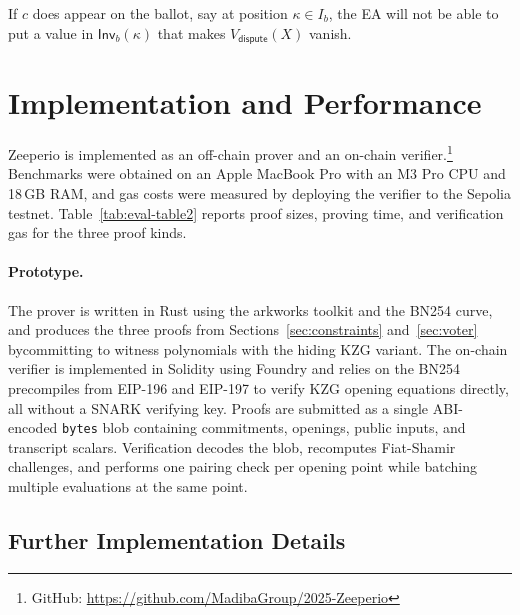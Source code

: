  If $c$ does appear on the ballot, say at position $\kappa\in I_b$, the EA will not be able to put a value in $\mathsf{Inv}_b(\kappa)$ that makes $V_{\mathsf{dispute}}(X)$ vanish. 






\section{Implementation and Performance}
Zeeperio is implemented as an off-chain prover and an on-chain verifier.\footnote{GitHub: \url{https://github.com/MadibaGroup/2025-Zeeperio}}
Benchmarks were obtained on an Apple MacBook Pro with an M3 Pro CPU and 18\,GB RAM, and gas costs were
measured by deploying the verifier to the Sepolia testnet.
Table~\ref{tab:eval-table2} reports proof sizes, proving time, and verification gas for the three proof kinds.\footnotemark
{}




\paragraph{Prototype.}
The prover is written in Rust using the arkworks toolkit and the BN254 curve, and produces the three proofs from Sections~\ref{sec:constraints} and~\ref{sec:voter} bycommitting to witness polynomials
with the hiding KZG variant.
The on-chain verifier is implemented in Solidity using Foundry and relies on the BN254 precompiles from
EIP-196 and EIP-197 to verify KZG opening equations directly, all without a SNARK verifying key.
Proofs are submitted as a single ABI-encoded \texttt{bytes} blob containing commitments, openings, public inputs,
and transcript scalars. Verification decodes the blob, recomputes Fiat-Shamir challenges, and performs one
pairing check per opening point while batching multiple evaluations at the same point.


\subsection{Further Implementation Details}
\label{app:implementation}

